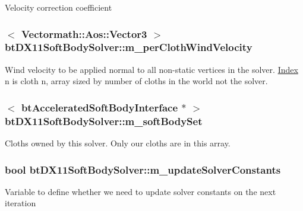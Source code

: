 Velocity correction coefficient \hypertarget{classbt_d_x11_soft_body_solver_a987c1c220a3f6c88c67bf2c1d781f3e6}{
\subsubsection[{m\+\_\+per\+Cloth\+Wind\+Velocity}]{$<$ {\bf Vectormath\+::\+Aos\+::\+Vector3} $>$ bt\+D\+X11\+Soft\+Body\+Solver\+::m\+\_\+per\+Cloth\+Wind\+Velocity\hspace{0.3cm}{\ttfamily [protected]}}}\label{classbt_d_x11_soft_body_solver_a987c1c220a3f6c88c67bf2c1d781f3e6}
Wind velocity to be applied normal to all non-\/static vertices in the solver. \hyperlink{struct_index}{Index} n is cloth n, array sized by number of cloths in the world not the solver. \hypertarget{classbt_d_x11_soft_body_solver_af47b0c45db2b0cb04736c11d2535d1c7}{
\subsubsection[{m\+\_\+soft\+Body\+Set}]{$<$ {\bf bt\+Accelerated\+Soft\+Body\+Interface} $\ast$ $>$ bt\+D\+X11\+Soft\+Body\+Solver\+::m\+\_\+soft\+Body\+Set\hspace{0.3cm}{\ttfamily [protected]}}}\label{classbt_d_x11_soft_body_solver_af47b0c45db2b0cb04736c11d2535d1c7}
Cloths owned by this solver. Only our cloths are in this array. \hypertarget{classbt_d_x11_soft_body_solver_a15ab079a7dde751958b96341c4bcb08b}{
\subsubsection[{m\+\_\+update\+Solver\+Constants}]{\setlength{\rightskip}{0pt plus 5cm}bool bt\+D\+X11\+Soft\+Body\+Solver\+::m\+\_\+update\+Solver\+Constants\hspace{0.3cm}{\ttfamily [protected]}}}\label{classbt_d_x11_soft_body_solver_a15ab079a7dde751958b96341c4bcb08b}
Variable to define whether we need to update solver constants on the next iteration 

